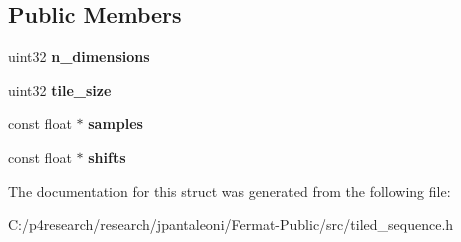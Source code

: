 \subsection*{Public Members}
\begin{DoxyCompactItemize}
\item 
\mbox{\label{struct_tiled_sequence_view_a52f246e06774e4d559f4161ccd713b9a}} 
uint32 {\bfseries n\+\_\+dimensions}
\item 
\mbox{\label{struct_tiled_sequence_view_ae815bc08d3f8836eb45e806c70c37815}} 
uint32 {\bfseries tile\+\_\+size}
\item 
\mbox{\label{struct_tiled_sequence_view_ad8fe8ad4e9cb241023b6327de8036213}} 
const float $\ast$ {\bfseries samples}
\item 
\mbox{\label{struct_tiled_sequence_view_a54420151b70e0f6b13bb56d2902d0561}} 
const float $\ast$ {\bfseries shifts}
\end{DoxyCompactItemize}


The documentation for this struct was generated from the following file\+:\begin{DoxyCompactItemize}
\item 
C\+:/p4research/research/jpantaleoni/\+Fermat-\/\+Public/src/tiled\+\_\+sequence.\+h\end{DoxyCompactItemize}
